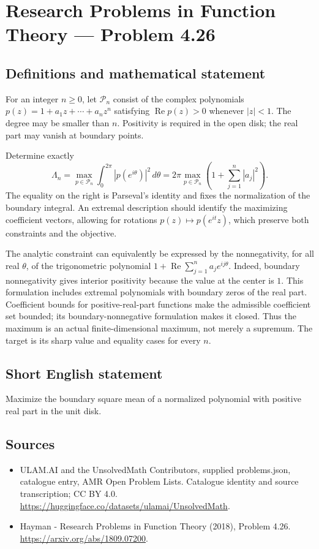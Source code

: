 \documentclass[11pt,a4paper]{article}
\begin{document}
\section*{Research Problems in Function Theory — Problem 4.26}\label{statement}

\subsection{Definitions and mathematical statement}
For an integer $n\geq0$, let $\mathcal P_n$ consist of the complex
polynomials
$p(z)=1+a_1z+\cdots+a_nz^n$ satisfying
$\operatorname{Re}p(z)>0$ whenever $|z|<1$. The degree may be
smaller than $n$. Positivity is required in the open disk; the
real part may vanish at boundary points.

Determine exactly
\[
 \Lambda_n=\max_{p\in\mathcal P_n}
       \int_0^{2\pi}|p(e^{i\theta})|^2\,d\theta
       =2\pi\max_{p\in\mathcal P_n}
                   \left(1+\sum_{j=1}^{n}|a_j|^2\right).
\]
The equality on the right is Parseval's identity and fixes the
normalization of the boundary integral. An extremal description
should identify the maximizing coefficient vectors, allowing for
rotations $p(z)\mapsto p(e^{it}z)$, which preserve both constraints
and the objective.

The analytic constraint can equivalently be expressed by the
nonnegativity, for all real $\theta$, of the trigonometric
polynomial
$1+\operatorname{Re}\sum_{j=1}^{n}a_je^{ij\theta}$.
Indeed, boundary nonnegativity gives interior positivity because
the value at the center is $1$. This formulation includes extremal
polynomials with boundary zeros of the real part. Coefficient
bounds for positive-real-part functions make the admissible
coefficient set bounded; its boundary-nonnegative formulation
makes it closed. Thus the maximum is an actual finite-dimensional
maximum, not merely a supremum. The target is its sharp value
and equality cases for every $n$.
\subsection{Short English statement}
Maximize the boundary square mean of a normalized polynomial with positive real part in the unit disk.
\subsection{Sources}
\begin{itemize}
\item[S1] ULAM.AI and the UnsolvedMath Contributors, supplied problems.json, catalogue entry, AMR Open Problem Lists. Catalogue identity and source transcription; CC BY 4.0.
\url{https://huggingface.co/datasets/ulamai/UnsolvedMath}.
\item[S2] Hayman - Research Problems in Function Theory (2018), Problem 4.26. 
\url{https://arxiv.org/abs/1809.07200}.
\end{itemize}
\end{document}
